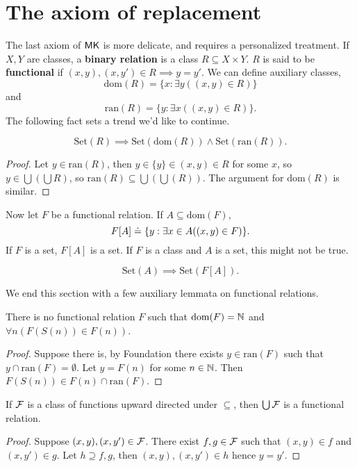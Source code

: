 \documentclass[twoside,openright,titlepage,numbers=noenddot,%
               headinclude,footinclude,cleardoublepage=empty,abstract=on,
               BCOR=23mm,paper=letter,fontsize=11pt
               ]{scrreprt}
\begin{document}
\section{The axiom of replacement}
The last axiom of $\mathsf{MK}$ is more delicate, and requires a personalized treatment. If $X,Y$ are classes, a \textbf{binary relation} is a class $R \subseteq X \times Y$. $R$ is said to be \textbf{functional} if $(x,y),(x,y') \in R \implies y = y'$. We can define auxiliary classes,
\[ \mathrm{dom}(R) = \{x: \exists y((x,y) \in R)\}\]
and
\[ \mathrm{ran}(R) = \{y: \exists x((x,y) \in R)\}.\]
The following fact sets a trend we'd like to continue.
\begin{proposition}
    \[ \mathrm{Set}(R) \implies \mathrm{Set}(\mathrm{dom}(R)) \land \mathrm{Set}(\mathrm{ran}(R)). \]
\end{proposition}
\begin{proof}
Let $y \in \mathrm{ran}(R)$, then $y \in \{y\} \in (x,y) \in R$ for some $x$, so $y \in \bigcup(\bigcup R)$, so $\mathrm{ran}(R) \subseteq \bigcup(\bigcup(R))$. The argument for $\mathrm{dom}(R)$ is similar.
\end{proof}
Now let $F$ be a functional relation. If $A \subseteq \mathrm{dom}(F)$,
\[ F[A] \hskip1mm\dot{=}\hskip1mm \{y: \exists x \in A((x,y) \in F)\}. \]
If $F$ is a set, $F[A]$ is a set. If $F$ is a class and $A$ is a set, this might not be true.
\begin{axiom}[Replacement]
    \[ \mathrm{Set}(A) \implies \mathrm{Set}(F[A]). \]
\end{axiom}
We end this section with a few auxiliary lemmata on functional relations.
\begin{lemma}
    There is no functional relation $F$ such that $\mathrm{dom}(F) = \mathbb{N}$ and $\forall n(F(S(n)) \in F(n))$.
\end{lemma}
\begin{proof}
    Suppose there is, by Foundation there exists $y \in \mathrm{ran}(F)$ such that $y \cap \mathrm{ran}(F) = \emptyset$. Let $y = F(n)$ for some $n \in \mathbb{N}$. Then $F(S(n)) \in F(n) \cap \mathrm{ran}(F)$.
\end{proof}
\begin{lemma}
    \label{lem:unionfunction}
    If $\mathcal{F}$ is a class of functions upward directed under $\subseteq$, then $\bigcup \mathcal{F}$ is a functional relation.
\end{lemma}
\begin{proof}
    Suppose $(x,y),(x,y') \in \mathcal{F}$. There exist $f,g \in \mathcal{F}$ such that $(x,y) \in f$ and $(x,y') \in g$. Let $h \supseteq f,g$, then $(x,y),(x,y') \in h$ hence $y = y'$.
\end{proof}
\end{document}
